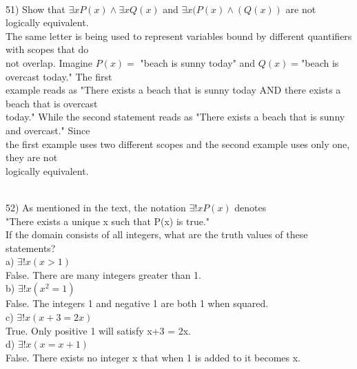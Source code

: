 \documentclass{article}
\begin{document}
\begin{flushleft}
~\\
\setlength\parindent{0pt}51) Show that $\exists x P(x) \land \exists x Q(x)$ and $\exists x(P(x) \land (Q(x))$ are not logically equivalent.\\
\setlength\parindent{24pt} The same letter is being used to represent variables bound by different quantifiers with scopes that do \\
not overlap.  Imagine $P(x) =$ "beach is sunny today" and $Q(x) = $"beach is overcast today."  The first \\example reads as "There exists a beach that is sunny today AND there exists a beach that is overcast \\
today."  While the second statement reads as "There exists a beach that is sunny and overcast."  Since \\the first example uses two different scopes and the second example uses only one, they are not \\logically equivalent.

~\\
\setlength\parindent{0pt}52) As mentioned in the text, the notation $\exists! x P(x)$ denotes \\
\setlength\parindent{24pt}"There exists a unique x such that P(x) is true."\\
\setlength\parindent{0pt}If the domain consists of all integers, what are the truth values of these statements?\\
\setlength\parindent{24pt}a) $\exists! x (x > 1)$\\
\setlength\parindent{48pt} False.  There are many integers greater than 1.\\

\setlength\parindent{24pt}b) $\exists! x (x^2 = 1)$\\
\setlength\parindent{48pt} False.  The integers 1 and negative 1 are both 1 when squared.\\
\setlength\parindent{24pt}c) $\exists! x (x+3 = 2x)$\\
\setlength\parindent{48pt} True.  Only positive 1 will satisfy x+3 = 2x.\\
\setlength\parindent{24pt}d) $\exists! x (x = x +1)$\\
\setlength\parindent{48pt} False.  There exists no integer x that when 1 is added to it becomes x.\\



\end{flushleft}
\end{document}
